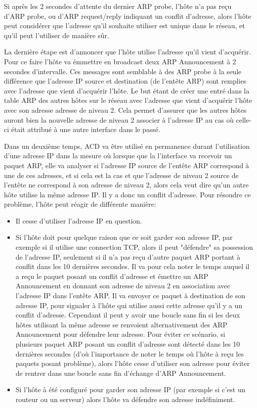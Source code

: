 Si après les 2 secondes d'attente du dernier ARP probe, l'hôte n'a pas reçu
d'ARP probe, ou d'ARP request/reply indiquant un conflit d'adresse, alors
l'hôte peut considérer que l'adresse qu'il souhaite utiliser est unique dans le
réseau, et qu'il peut l'utiliser de manière sûr.

La dernière étape est d'annoncer que l'hôte utilise l'adresse qu'il vient
d'acquérir.  Pour ce faire l'hôte va émmettre en broadcast deux ARP
Announcement à 2 secondes d'intervalle.  Ces messages sont semblable à des ARP
probe à la seule différence que l'adresse IP source et destination (de l'entête
ARP) sont remplies avec l'adresse que vient d'acquérir l'hôte.  Le but étant de
créer une entré dans la table ARP des autres hôtes sur le réseau avec l'adresse
que vient d'acquérir l'hôte avec son adresse adresse de niveau 2. Cela permet
d'assurer que les autres hôtes auront bien la nouvelle adresse de niveau 2
associer à l'adresse IP au cas où celle-ci était attribué à une autre interface
dans le passé.


Dans un deuxième temps, ACD va être utilisé en permanence durant l'utilisation
d'une adresse IP dans la mesure où lorsque que la l'interface va recevoir un
paquet ARP, elle va analyser si l'adresse IP source de l'entête ARP correspond
à une de ces adresses, et si cela est la cas et que l'adresse de niveau 2
source de l'entête ne correspond à son adresse de niveau 2, alors cela veut
dire qu'un autre hôte utilise la même adresse IP. Il y a donc un conflit
d'adresse.  Pour résoudre ce problème, l'hôte peut réagir de différente
manière:
\begin{itemize}
\item Il cesse d'utiliser l'adresse IP en question.
\item Si l'hôte doit pour quelque raison que ce soit garder son adresse IP, par exemple si il
utilise une connection TCP, alors il peut "défendre" sa possession de l'adresse IP, seulement si
il n'a pas reçu d'autre paquet ARP portant à conflit dans les 10 dernières secondes.
Il va pour cela noter le temps auquel il a reçu le paquet posant un conflit d'adresse et émettre un ARP Announcement en donnant son adresse de niveau 2 en association avec
l'adresse IP dans l'entête ARP. Il va envoyer ce paquet à destination de son adresse IP, pour signaler à l'hôte qui utilise
aussi cette adresse qu'il y a un conflit d'adresse. Cependant il peut y avoir une boucle sans
fin si les deux hôtes utilisant la même adresse se renvoient alternativement des ARP Announcement
pour défendre leur adresse. Pour éviter ce scénario, si plusieurs paquet ARP posant un conflit
d'adresse sont détecté dans les 10 dernières secondes (d'où l'importance de noter le temps où l'hôte à reçu les paquets posant problème), alors l'hôte cesse d'utiliser son adresse
pour éviter de rentrer dans une boucle sans fin d'échange d'ARP Announcement.
\item Si l'hôte à été configuré pour garder son adresse IP (par exemple si c'est un routeur
ou un serveur) alors l'hôte va défendre son adresse indéfiniment.
\end{itemize}


